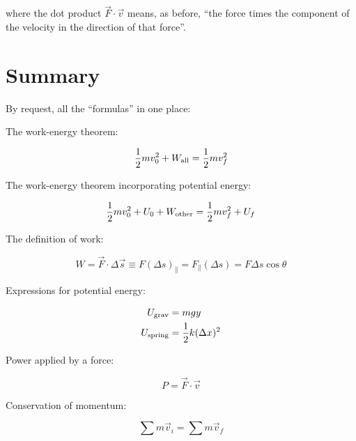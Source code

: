 \documentclass[10pt]{article}
\begin{document}
where the dot product $\vec F \cdot \vec v$ means, as before, ``the force times the component of the velocity in the direction of that force''.
\newpage
\section{Summary}

By request, all the ``formulas'' in one place:

The work-energy theorem:

\begin{equation}
\frac{1}{2}mv_0^2 + W_{\rm all} = \frac{1}{2}mv_f^2
\end{equation}

The work-energy theorem incorporating potential energy:

\begin{equation}
\frac{1}{2}mv_0^2 + U_0 + W_{\rm other} = \frac{1}{2}mv_f^2 + U_f
\end{equation}

The definition of work:

\begin{equation}
W = \vec F \cdot \Delta \vec s \equiv F (\Delta s)_\parallel = F_\parallel(\Delta s) = F \Delta s \cos \theta
\end{equation}

Expressions for potential energy:

\begin{align}
U_{\rm grav} &= mgy \\
U_{\rm spring} &= \frac{1}{2}k(\Delta x)^2
\end{align}

Power applied by a force:

\begin{equation}
P = \vec F \cdot \vec v
\end{equation}

Conservation of momentum:

\begin{equation}
\sum m \vec v_i = \sum m \vec v_f
\end{equation}
\end{document}
